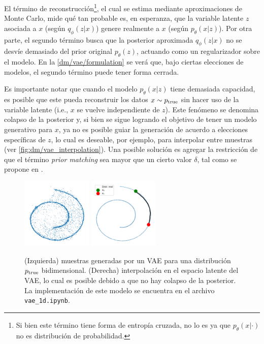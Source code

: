 El término de reconstrucción\footnote{Si bien este término tiene forma de entropía cruzada, no lo es ya que $p_\theta(x|\cdot)$ no es distribución de probabilidad.}, el cual se estima mediante aproximaciones de Monte Carlo, mide qué tan probable es, en esperanza, que la variable latente $z$ asociada a $x$ (según $q_\phi(z|x)$) genere realmente a $x$ (según $p_\theta(x|z)$). Por otra parte, el segundo término busca que la posterior aproximada $q_\phi(z|x)$ no se desvíe demasiado del prior original $p_\theta(z)$, actuando como un regularizador sobre el modelo. En la \autoref{dm/vae/formulation} se verá que, bajo ciertas elecciones de modelos, el segundo término puede tener forma cerrada.

Es importante notar que cuando el modelo $p_\theta(x|z)$ tiene demasiada capacidad, es posible que este pueda reconstruir los datos $x\sim p_{\operatorname{true}}$ sin hacer uso de la variable latente (i.e., $x$ se vuelve independiente de $z$). Este fenómeno se denomina colapso de la posterior y, si bien se sigue logrando el objetivo de tener un modelo generativo para $x$, ya no es posible guiar la generación de acuerdo a elecciones específicas de $z$, lo cual es deseable, por ejemplo, para interpolar entre muestras (ver \autoref{fig:dm/vae_interpolation}). Una posible solución es agregar la restricción de que el término \textit{prior matching} sea mayor que un cierto valor $\delta$, tal como se propone en \cite{razavi2019preventing}.

\begin{figure}
    \centering
    \includegraphics[width=0.3\textwidth]{images/dm/vae_samples_1d}
    \includegraphics[width=0.3\textwidth]{images/dm/vae_interpolation_1d}
    \caption{(Izquierda) muestras generadas por un VAE para una distribución $p_{\operatorname{true}}$ bidimensional. (Derecha) interpolación en el espacio latente del VAE, lo cual es posible debido a que no hay colapso de la posterior. La implementación de este modelo se encuentra en el archivo \texttt{vae\_1d.ipynb}.}
    \label{fig:dm/vae_interpolation}
\end{figure}

